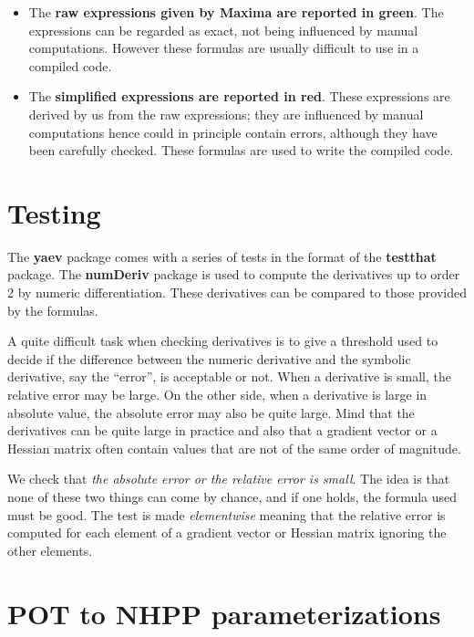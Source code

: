 \documentclass[11pt]{article}\usepackage[]{graphicx}\usepackage[]{xcolor}
\begin{document}
\begin{itemize}
\item The {\color{MonVertF} \bf raw expressions given by Maxima are reported
    in green}. The expressions can be regarded
  as exact, not being influenced by manual computations. However
  these formulas are usually difficult to use in a compiled code.

\item The {\color{red} \bf simplified expressions are reported in
    red}.  These expressions are derived by us from the raw
  expressions; they are influenced by manual computations hence could
  in principle contain errors, although they have been carefully
  checked. These formulas are used to write the compiled code.
  
\end{itemize}

\section{Testing}

The \textbf{yaev} package comes with a series of tests in the format
of the \textbf{testthat} package. The \textbf{numDeriv} package is
used to compute the derivatives up to order 2 by numeric
differentiation. These derivatives can be compared to those provided
by the formulas.

A quite difficult task when checking derivatives is to give a
threshold used to decide if the difference between the numeric
derivative and the symbolic derivative, say the ``error'', is
acceptable or not. When a derivative is small, the relative error may
be large.  On the other side, when a derivative is large in absolute
value, the absolute error may also be quite large.  Mind that the
derivatives can be quite large in practice and also that a gradient
vector or a Hessian matrix often contain values that are not of the
same order of magnitude.

We check that \textit{the absolute error or the relative error is
  small}. The idea is that none of these two things can come by
chance, and if one holds, the formula used must be good. The test is
made \textit{elementwise} meaning that the relative error is computed
for each element of a gradient vector or Hessian matrix ignoring the
other elements.

\section{POT to NHPP parameterizations}
\end{document}
